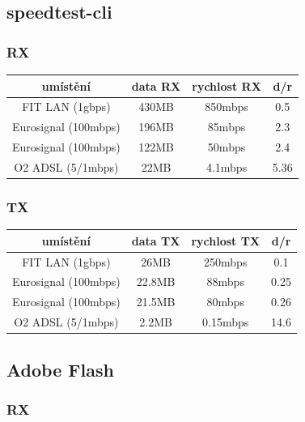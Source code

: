 \documentclass[12pt,a4paper]{article}
\begin{document}
\subsection{speedtest-cli}

\subsubsection{RX}

\begin{center}
\begin{tabular}{ | c || c | c | c | }
\hline
umístění &  data RX & rychlost RX & d/r \\
\hline
\hline
FIT LAN (1gbps)      & 430MB  & 850mbps & 0.5	\\ \hline
Eurosignal (100mbps) & 196MB  & 85mbps  & 2.3	\\ \hline
Eurosignal (100mbps) & 122MB  & 50mbps  & 2.4	\\ \hline
O2 ADSL (5/1mbps)    & 22MB   & 4.1mbps & 5.36	\\ \hline

\end{tabular}
\end{center}

\subsubsection{TX}

\begin{center}
\begin{tabular}{ | c || c | c | c | }
\hline
umístění &  data TX & rychlost TX & d/r	\\
\hline
\hline
FIT LAN (1gbps)      & 26MB   & 250mbps  & 0.1	 \\ \hline
Eurosignal (100mbps) & 22.8MB & 88mbps   & 0.25	 \\ \hline
Eurosignal (100mbps) & 21.5MB & 80mbps   & 0.26	 \\ \hline
O2 ADSL (5/1mbps)    & 2.2MB  & 0.15mbps & 14.6	 \\ \hline

\end{tabular}
\end{center}


\bigskip


\subsection{Adobe Flash}

\subsubsection{RX}
\end{document}
